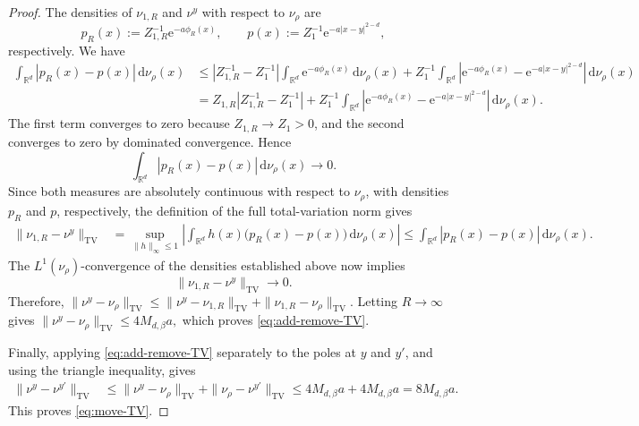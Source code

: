 \documentclass[12pt,reqno,letterpaper]{amsart}
\theoremstyle{definition}
\theoremstyle{remark}
\numberwithin{equation}{section}
\newcommand{\R}{\mathbb R}
\newcommand{\dd}{\,\mathrm d}
\newcommand{\ee}{\mathrm e}
\newcommand{\be}{\beta}
\newcommand{\TV}{\mathrm{TV}}
\begin{document}
\begin{proof}
The densities of \(\nu_{1,R}\) and \(\nu^y\) with respect to \(\nu_\rho\)
are
\[
 p_R(x):=Z_{1,R}^{-1}\ee^{-a\phi_R(x)},
 \qquad
 p(x):=Z_1^{-1}\ee^{-a|x-y|^{2-d}},
\]
respectively.  We have
\begin{align*}
 \int_{\R^d}|p_R(x)-p(x)|\dd\nu_\rho(x)
 &\le
 \left|Z_{1,R}^{-1}-Z_1^{-1}\right|
 \int_{\R^d}\ee^{-a\phi_R(x)}\dd\nu_\rho(x)+
 Z_1^{-1}
 \int_{\R^d}
 \left|
 \ee^{-a\phi_R(x)}
 -\ee^{-a|x-y|^{2-d}}
 \right|
 \dd\nu_\rho(x)\\
 &=
 Z_{1,R}\left|Z_{1,R}^{-1}-Z_1^{-1}\right|+Z_1^{-1}
 \int_{\R^d}
 \left|
 \ee^{-a\phi_R(x)}
 -\ee^{-a|x-y|^{2-d}}
 \right|
 \dd\nu_\rho(x).
\end{align*}
The first term converges to zero because \(Z_{1,R}\to Z_1>0\), and the
second converges to zero by dominated convergence.  Hence
\[
 \int_{\R^d}|p_R(x)-p(x)|\dd\nu_\rho(x)\longrightarrow0.
\]
Since both measures are absolutely continuous with respect to \(\nu_\rho\),
with densities \(p_R\) and \(p\), respectively, the definition of the full
total-variation norm gives
\begin{align*}
 \|\nu_{1,R}-\nu^y\|_{\TV}
 &=
 \sup_{\|h\|_\infty\le1}
 \left|
 \int_{\R^d}h(x)\bigl(p_R(x)-p(x)\bigr)\dd\nu_\rho(x)
 \right|\le
 \int_{\R^d}|p_R(x)-p(x)|\dd\nu_\rho(x).
\end{align*}
The \(L^1(\nu_\rho)\)-convergence of the densities established above now
implies
\[
 \|\nu_{1,R}-\nu^y\|_{\TV}\longrightarrow0.
\]
Therefore,  $\|\nu^y-\nu_\rho\|_{\TV}
 \le
 \|\nu^y-\nu_{1,R}\|_{\TV}
 +\|\nu_{1,R}-\nu_\rho\|_{\TV}.$
Letting \(R\to\infty\) gives $\|\nu^y-\nu_\rho\|_{\TV}
 \le4M_{d,\be}a,$
which proves \eqref{eq:add-remove-TV}.

Finally, applying \eqref{eq:add-remove-TV} separately to the poles at
\(y\) and \(y'\), and using the triangle inequality, gives
\begin{align*}
 \|\nu^y-\nu^{y'}\|_{\TV}
 &\le
 \|\nu^y-\nu_\rho\|_{\TV}
 +\|\nu_\rho-\nu^{y'}\|_{\TV}\le
 4M_{d,\be}a+4M_{d,\be}a=8M_{d,\be}a.
\end{align*}
This proves \eqref{eq:move-TV}.
\end{proof}
\end{document}
